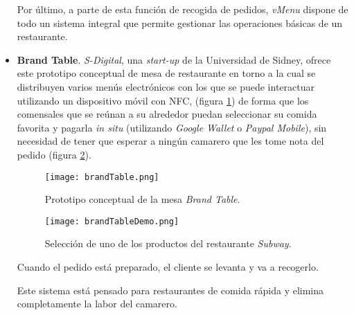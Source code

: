 \begin{itemize}
    Por último, a parte de esta función de recogida de pedidos, \emph{vMenu} 
    dispone de todo un sistema integral que permite gestionar las operaciones
    básicas de un restaurante\cite{bib:VMENU}.

    \item \textbf{Brand Table}. \emph{S-Digital}, una \emph{start-up} de la
    Universidad de Sidney, ofrece este prototipo conceptual de mesa de
    restaurante en torno a la cual se distribuyen varios menús electrónicos con
    los que se puede interactuar utilizando un dispositivo móvil con \acs{NFC},
    (figura \ref{fig:brandTable}) de forma que los comensales que se reúnan a 
    su alrededor puedan seleccionar su comida favorita y pagarla
    \emph{in situ} (utilizando \emph{Google Wallet} o \emph{Paypal Mobile}), 
    sin necesidad de tener que esperar a ningún camarero que les tome nota del 
    pedido (figura \ref{fig:brandTableDemo}).

    \begin{figure}[!h]
      \begin{center}
        \texttt{[image: brandTable.png]}
        \caption{Prototipo conceptual de la mesa \emph{Brand Table}.}
        \label{fig:brandTable}
      \end{center}
    \end{figure}

    \begin{figure}[!h]
      \begin{center}
        \texttt{[image: brandTableDemo.png]}
        \caption{Selección de uno de los productos del restaurante
        \emph{Subway}.}
        \label{fig:brandTableDemo}
      \end{center}
    \end{figure}

    Cuando el pedido está preparado, el cliente se levanta y va a recogerlo.
    
    Este sistema está pensado para restaurantes de comida rápida y elimina
    completamente la labor del camarero\cite{bib:brandTable}.
    \end{itemize}


